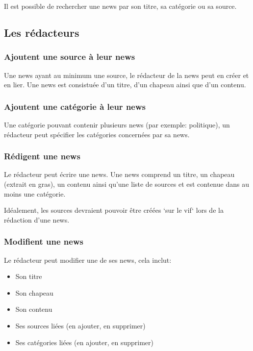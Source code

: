 \documentclass{article}
\begin{document}
Il est possible de rechercher une news par son titre, sa catégorie ou sa source.

\subsection{Les rédacteurs}

\subsubsection{Ajoutent une source à leur news}

Une news ayant au minimum une source, le rédacteur de la news peut en créer et en lier. Une news est consistuée d'un titre, d'un chapeau ainsi que d'un contenu. 

\subsubsection{Ajoutent une catégorie à leur news}

Une catégorie pouvant contenir plusieurs news (par exemple: politique), un rédacteur peut spécifier les catégories concernées par sa news.

\subsubsection{Rédigent une news}

Le rédacteur peut écrire une news. Une news comprend un titre, un chapeau (extrait en gras), un contenu ainsi qu'une liste de sources et est contenue dans au moins une catégorie.

Idéalement, les sources devraient pouvoir être créées `sur le vif` lors de la rédaction d'une news.

\subsubsection{Modifient une news}

Le rédacteur peut modifier une de ses news, cela inclut:
\begin{itemize}
\item Son titre
\item Son chapeau
\item Son contenu
\item Ses sources liées (en ajouter, en supprimer)
\item Ses catégories liées (en ajouter, en supprimer)
\end{itemize}
\end{document}
